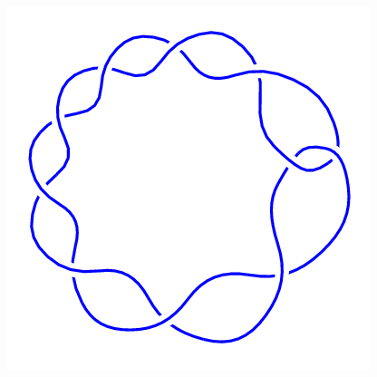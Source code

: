 \begin{figure}[H]
\begin{minipage}[b]{.18\linewidth}
    \end{minipage}
    \begin{minipage}[b]{.18\linewidth}
        \centering
        \includegraphics[width=\linewidth]{../data/10_1.png}
    \end{minipage}
\end{figure}
